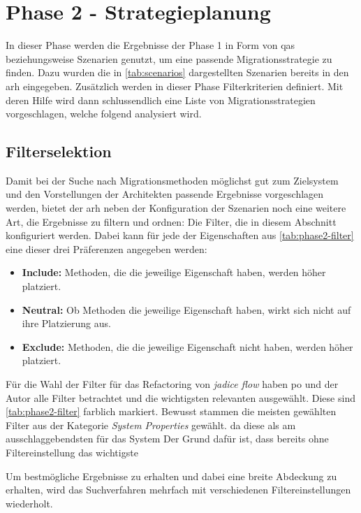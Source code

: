 \section{Phase 2 - Strategieplanung}
\label{sec:durchführung-phase2}

In dieser Phase werden die Ergebnisse der Phase 1 in Form von \glspl{qa} beziehungsweise Szenarien genutzt, um eine passende Migrationsstrategie zu finden.
Dazu wurden die in \cref{tab:scenarios} dargestellten Szenarien bereits in den \gls{arh} eingegeben.
Zusätzlich werden in dieser Phase Filterkriterien definiert.
Mit deren Hilfe wird dann schlussendlich eine Liste von Migrationsstrategien vorgeschlagen, welche folgend analysiert wird.

\subsection{Filterselektion}
Damit bei der Suche nach Migrationsmethoden möglichst gut zum Zielsystem und den Vorstellungen der Architekten passende Ergebnisse vorgeschlagen werden, bietet der \gls{arh} neben der Konfiguration der Szenarien noch eine weitere Art, die Ergebnisse zu filtern und ordnen: Die Filter, die in diesem Abschnitt konfiguriert werden.
Dabei kann für jede der Eigenschaften aus \cref{tab:phase2-filter} eine dieser drei Präferenzen angegeben werden:
\begin{itemize}
	\item \textbf{Include:} Methoden, die die jeweilige Eigenschaft haben, werden höher platziert.
	\item \textbf{Neutral:} Ob Methoden die jeweilige Eigenschaft haben, wirkt sich nicht auf ihre Platzierung aus.
	\item \textbf{Exclude:} Methoden, die die jeweilige Eigenschaft nicht haben, werden höher platziert.
\end{itemize}


Für die Wahl der Filter für das Refactoring von \emph{jadice flow} haben \gls{po} und der Autor alle Filter betrachtet und die wichtigsten relevanten ausgewählt.
Diese sind \cref{tab:phase2-filter} farblich markiert.
Bewusst stammen die meisten gewählten Filter aus der Kategorie \emph{System Properties} gewählt. da diese als am ausschlaggebendsten für das System 
Der Grund dafür ist, dass bereits ohne Filtereinstellung das wichtigste 

Um bestmögliche Ergebnisse zu erhalten und dabei eine breite Abdeckung zu erhalten, wird das Suchverfahren mehrfach mit verschiedenen Filtereinstellungen wiederholt.

